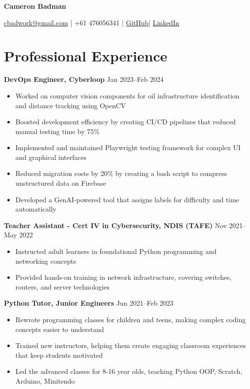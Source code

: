 \documentclass[10pt,a4paper]{article}
\begin{document}
	\begin{center}
		{\huge\textbf{Cameron Badman}}
		\begin{center}
		\href{mailto:cbadwork@gmail.com}{cbadwork@gmail.com} |
		+61 476056341 |
		\href{https://github.com/CameronBadman}{GitHub}| 
		\href{https://www.linkedin.com/in/cameron-badman-5314ba1b8/}{LinkedIn}
		\end{center}
	\end{center}
	
	\section{Professional Experience}
	\textbf{DevOps Engineer, Cyberloop} \hfill Jan 2023--Feb 2024 
	\begin{itemize}[label=\textbullet, itemsep=0.05cm]
		\item Worked on computer vision components for oil infrastructure identification and distance tracking using OpenCV
		\item Boosted development efficiency by creating CI/CD pipelines that reduced manual testing time by 75\%
		\item Implemented and maintained Playwright testing framework for complex UI and graphical interfaces
		\item Reduced migration costs by 20\% by creating a bash script to compress unstructured data on Firebase
		\item Developed a GenAI-powered tool that assigns labels for difficulty and time automatically
	\end{itemize}
	\vspace{0.1cm}
	
	\textbf{Teacher Assistant - Cert IV in Cybersecurity, NDIS (TAFE)} \hfill Nov 2021--May 2022 
	\begin{itemize}[label=\textbullet, itemsep=0.05cm]
		\item Instructed adult learners in foundational Python programming and networking concepts
		\item Provided hands-on training in network infrastructure, covering switches, routers, and server technologies
	\end{itemize}
	\vspace{0.1cm}
	
	\textbf{Python Tutor, Junior Engineers} \hfill Jun 2021--Feb 2023 
	\begin{itemize}[label=\textbullet, itemsep=0.05cm]
		\item Rewrote programming classes for children and teens, making complex coding concepts easier to understand
		\item Trained new instructors, helping them create engaging classroom experiences that keep students motivated
		\item Led the advanced classes for 8-16 year olds, teaching Python OOP, Scratch, Arduino, Minitendo
	\end{itemize}
	\vspace{0.1cm}
	
\end{document}
